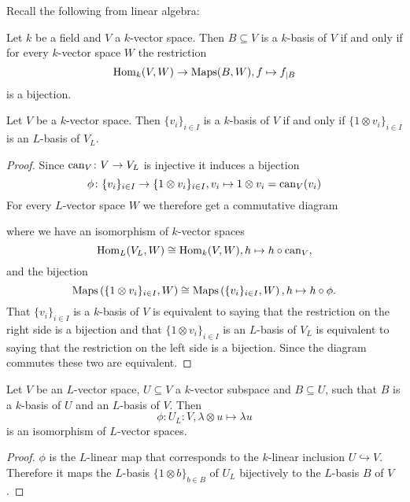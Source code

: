 Recall the following from linear algebra:


\begin{rec}
 Let $k$ be a field and $V$ a $k$-vector space. Then $B \subseteq V$ is a $k$-basis of $V$ if and only if for every $k$-vector space $W$ the restriction
 \[
  \operatorname{Hom}_k(V,W) \to \operatorname{Maps}(B,W), f \mapsto f_{|B}
 \]
 is a bijection.
\end{rec}


\begin{lem}
 Let $V$ be a $k$-vector space. Then $\{v_i\}_{i \in I}$ is a $k$-basis of $V$ if and only if $\{1 \otimes v_i\}_{i \in I}$ is an $L$-basis of $V_L$.
\end{lem}
\begin{proof}
 Since $\operatorname{can}_V \colon V \to V_L$ is injective it induces a bijection
 \[
  \phi \colon \{v_i\}_{i \in I} \to \{1 \otimes v_i\}_{i \in I}, v_i \mapsto 1 \otimes v_i = \operatorname{can}_V(v_i)
 \]
 For every $L$-vector space $W$ we therefore get a commutative diagram
 \begin{center}
 \end{center}
 where we have an isomorphism of $k$-vector spaces
 \[
  \operatorname{Hom}_L(V_L, W) \cong \operatorname{Hom}_k(V, W), h \mapsto h \circ \operatorname{can}_V,
 \]
 and the bijection
 \[
  \operatorname{Maps}\left( \{1 \otimes v_i\}_{i \in I}, W\right ) \cong \operatorname{Maps}\left( \{v_i\}_{i \in I} ,W\right ), h \mapsto h \circ \phi.
 \]
 That $\{v_i\}_{i \in I}$ is a $k$-basis of $V$ is equivalent to saying that the restriction on the right side is a bijection and that $\{1 \otimes v_i\}_{i \in I}$ is an $L$-basis of $V_L$ is equivalent to saying that the restriction on the left side is a bijection. Since the diagram commutes these two are equivalent.
\end{proof}


\begin{cor}\label{cor: inclusion to bijection vector spaces}
 Let $V$ be an $L$-vector space, $U \subseteq V$ a $k$-vector subspace and $B \subseteq U$, such that $B$ is a $k$-basis of $U$ and an $L$-basis of $V$. Then
 \[
  \phi \colon U_L \colon V, \lambda \otimes u \mapsto \lambda u
 \]
 is an isomorphism of $L$-vector spaces.
\end{cor}
\begin{proof}
 $\phi$ is the $L$-linear map that corresponds to the $k$-linear inclusion $U \hookrightarrow V$. Therefore it maps the $L$-basis $\{1 \otimes b\}_{b \in B}$ of $U_L$ bijectively to the $L$-basis $B$ of $V$.
\end{proof}





